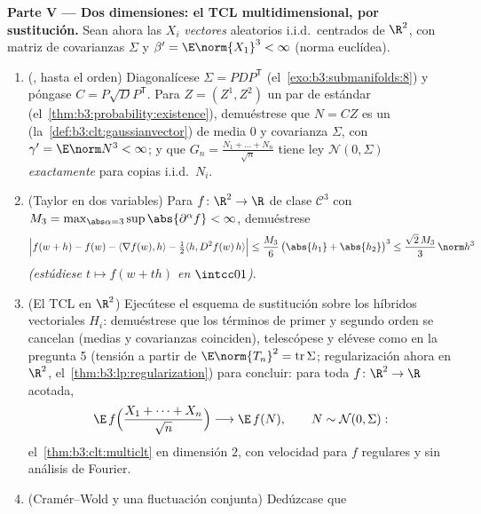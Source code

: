 \begin{problem}
\medskip
\noindent\textbf{Parte V --- Dos dimensiones: el TCL multidimensional,
por sustitución.} Sean ahora las $X_i$ \emph{vectores} aleatorios
i.i.d.\ centrados de $\R^2$, con matriz de covarianzas $\Sigma$ y
$\beta' = \E\norm{X_1}^3 <
\infty$ (norma euclídea).
\begin{enumerate}[resume]
  \item (, hasta
  el orden) Diagonalícese $\Sigma =
        PDP^{\mathsf T}$ (el~\cref{exo:b3:submanifolds:8}) y póngase
  $C = P\sqrt DP^{\mathsf T}$. Para $Z = (Z^1,
        Z^2)$ un par de 
  estándar 
  (el~\cref{thm:b3:probability:existence}), demuéstrese que $N
        = CZ$ es un 
  (la~\cref{def:b3:clt:gaussianvector}) de media $0$ y covarianza
  $\Sigma$, con $\gamma' = \E\norm N^3 <
        \infty$; y que $G_n = \frac{N_1 + \dots +
        N_n}{\sqrt n}$ tiene ley $\mathcal N(0, \Sigma)$
  \emph{exactamente} para copias i.i.d.\ $N_i$. \item (Taylor en dos
  variables) Para $f \colon \R^2 \to
        \R$ de clase $\mathcal C^3$ con $M_3 =
        \max_{\abs\alpha = 3}\sup\abs{\partial^\alpha f} <
        \infty$, demuéstrese
        \[
        \Bigl|f(w + h) - f(w) - \langle\nabla f(w),
        h\rangle - \tfrac12\langle h, D^2f(w)\,h\rangle
        \Bigr| \leq \frac{M_3}6\,\bigl(\abs{h_1} +
        \abs{h_2}\bigr)^3 \leq \frac{\sqrt2\,M_3}3\,
        \norm h^3
        \]
        \emph{(estúdiese $t \mapsto f(w + th)$ en
        $\intcc01$)}.
  \item (El TCL en $\R^2$) Ejecútese el esquema de sustitución sobre los
  híbridos vectoriales $H_i$: demuéstrese que los términos de primer y
  segundo orden se cancelan (medias y covarianzas coinciden),
  telescópese y elévese como en la pregunta 5 (tensión a partir de
  $\E\norm{T_n}^2 =
        \operatorname{tr}\Sigma$; regularización ahora en $\R^2$,
  el~\cref{thm:b3:lp:regularization}) para concluir: para toda $f \colon
        \R^2 \to \R$ 
  acotada,
        \[
        \E\,f\Bigl(\frac{X_1 + \dots + X_n}{\sqrt n}\Bigr)
        \longrightarrow \E\,f(N), \qquad N \sim \mathcal
        N(0, \Sigma) :
        \]
        el~\cref{thm:b3:clt:multiclt} en dimensión $2$, con velocidad
        para $f$ regulares y sin análisis de Fourier. \item
        (Cramér--Wold y una fluctuación conjunta) Dedúzcase que

\end{enumerate}
\end{problem}

